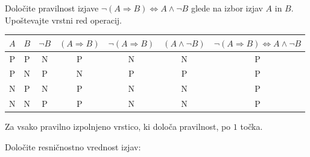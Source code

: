 \documentclass[addpoints,12pt]{exam}
\begin{document}
\begin{questions}

    
    \question[4]
    Določite pravilnost izjave $\lnot( A\Rightarrow  B)\Leftrightarrow A\land \lnot B$ glede na izbor izjav $A$ in $B$. Upoštevajte vrstni red operacij.

    \begin{solution}[9cm]
        \begin{table}[H]
            \begin{tabular}{ccccccc}
             $A$ & $B$ & $\lnot B$ & $(A\Rightarrow B)$ & $\lnot(A\Rightarrow B)$ & $(A\land \lnot B)$ & $\lnot( A\Rightarrow  B)\Leftrightarrow A\land \lnot B$\\ \hline
             P & P & N & P & N & N & P \\ 
             P & N & P & N & P & P & P \\
             N & P & N & P & N & N & P \\
             N & N & P & P & N & N & P
            \end{tabular}
        \end{table}
        Za vsako pravilno izpolnjeno vrstico, ki določa pravilnost, po $1$ točka.

    \end{solution}




    \question[3]
    Določite resničnostno vrednost izjav:


\end{questions}
\end{document}
